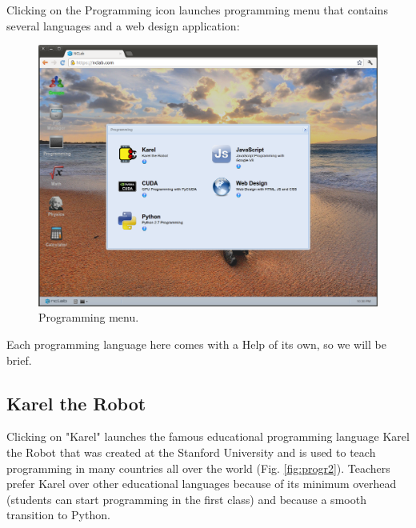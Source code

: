 \documentclass[article,A4,12pt]{llncs}
\begin{document}
Clicking on the Programming icon launches programming menu that 
contains several languages and a web design application:

\begin{figure}[!ht]
\begin{center}
\includegraphics[width=\textwidth]{img/progr1.png}
\end{center}
\caption{Programming menu.}
\label{fig:progr1}
\end{figure}
\noindent
Each programming language here comes with a Help of its own, so we 
will be brief. 

\subsection{Karel the Robot}

Clicking on "Karel" launches the famous educational 
programming language Karel the Robot that was created at the Stanford 
University and is used to teach programming in many countries all over 
the world (Fig. \ref{fig:progr2}). Teachers prefer Karel over other 
educational languages because of its minimum overhead (students can 
start programming in the first class) and because a smooth transition 
to Python.
\end{document}
